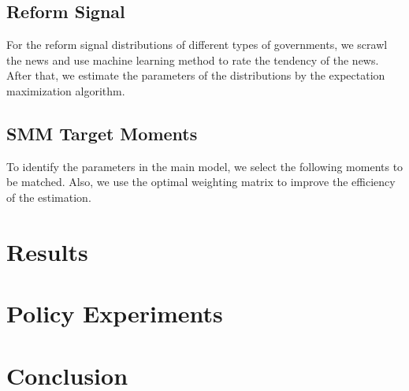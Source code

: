 \documentclass[12pt]{article}
\begin{document}
\begin{CJK*}{UTF8}{bsmi}
\subsection{Reform Signal}
For the reform signal distributions of different types of 
governments, we scrawl the news and use machine learning 
method to rate the tendency of the news. After that, we 
estimate the parameters of the distributions by the 
expectation maximization algorithm. 

\subsection{SMM Target Moments}
To identify the parameters in the main model, we select the 
following moments to be matched. Also, we use the optimal 
weighting matrix to improve the efficiency of the estimation. 


\section{Results}

\section{Policy Experiments} 

\section{Conclusion}



\end{CJK*}
\end{document}
